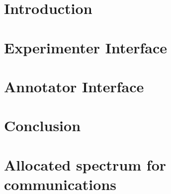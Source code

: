 \documentclass[11pt, final]{ucthesis}
\begin{document}
\begin{dissertationText}
\renewcommand{\baselinestretch}{1.66}

\chapter{Introduction
    \label{chap:introduction}}    %

\chapter{Experimenter Interface
    \label{chap:experimenter}}
    
\chapter{Annotator Interface
    \label{chap:annotator}}
    
\chapter{Conclusion
    \label{chap:conclusion}}
    


\clearpage


\ssp    %




\appendix
\chapter{Allocated spectrum for communications
    \label{appen:commspec}}
   
\end{dissertationText}
\end{document}
